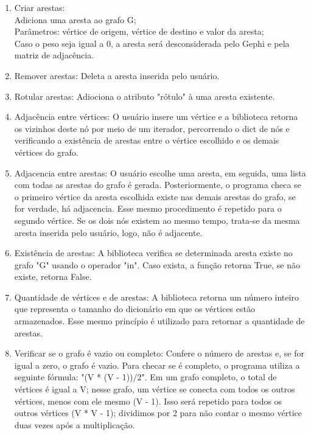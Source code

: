 \documentclass[12pt]{article}
\begin{document}
\begin{enumerate}[itemsep=8pt,parsep=8pt]
    \item Criar arestas:\\ Adiciona uma aresta ao grafo G;\\ Parâmetros: vértice de origem, vértice de destino e valor da aresta;\\ Caso o peso seja igual a 0, a aresta será desconsiderada pelo Gephi e pela matriz de adjacência.
    
    \item Remover arestas: Deleta a aresta inserida pelo usuário.
    
    \item Rotular arestas: Adiociona o atributo "rótulo" à uma aresta existente.
    
    \item Adjacência entre vértices: O usuário insere um vértice e a biblioteca retorna os vizinhos deste nó por meio de um iterador, percorrendo o dict de nós e verificando a existência de arestas entre o vértice escolhido e os demais vértices do grafo.
    
    \item Adjacencia entre arestas: O usuário escolhe uma aresta, em seguida, uma lista com todas as arestas do grafo é gerada. Posteriormente, o programa checa se o primeiro vértice da aresta escolhida existe nas demais arestas do grafo, se for verdade, há adjacencia. Esse mesmo procedimento é repetido para o segundo vértice. Se os dois nós existem ao mesmo tempo, trata-se da mesma aresta inserida pelo usuário, logo, não é adjacente.
    
    \item Existência de arestas: A biblioteca verifica se determinada aresta existe no grafo "G" usando o operador "in". Caso exista, a função retorna True, se não existe, retorna False.
    
    \item Quantidade de vértices e de arestas: A biblioteca retorna um número inteiro que representa o tamanho do dicionário em que os vértices estão armazenados. Esse mesmo princípio é utilizado para retornar a quantidade de arestas.
    
    \item Verificar se o grafo é vazio ou completo: Confere o número de arestas e, se for igual a zero, o grafo é vazio. Para checar se é completo, o programa utiliza a seguinte fórmula: "(V * (V - 1))/2". Em um grafo completo, o total de vértices é igual a V; nesse grafo, um vértice se conecta com todos os outros vértices, menos com ele mesmo (V - 1). Isso será repetido para todos os outros vértices (V * V - 1); dividimos por 2 para não contar o mesmo vértice duas vezes após a multiplicação.
    

\end{enumerate}
\end{document}

